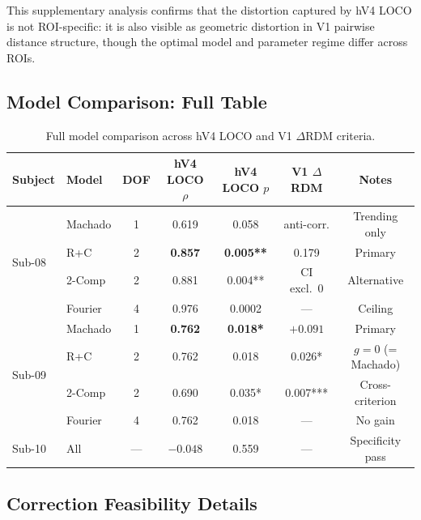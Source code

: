 \documentclass{article}
\begin{document}
This supplementary analysis confirms that the distortion captured by hV4 LOCO is not ROI-specific: it is also visible as geometric distortion in V1 pairwise distance structure, though the optimal model and parameter regime differ across ROIs.

\subsection{Model Comparison: Full Table}

\begin{table}[h]
  \caption{Full model comparison across hV4 LOCO and V1 $\Delta$RDM criteria.}
  \label{tab:full}
  \begin{center}
    \begin{small}
      \begin{tabular}{llccccc}
        \toprule
        Subject & Model & DOF & hV4 LOCO $\rho$ & hV4 LOCO $p$ & V1 $\Delta$RDM & Notes \\
        \midrule
        \multirow{4}{*}{Sub-08} & Machado & 1 & 0.619 & 0.058 & anti-corr. & Trending only \\
        & R+C & 2 & \textbf{0.857} & \textbf{0.005**} & 0.179 & Primary \\
        & 2-Comp & 2 & 0.881 & 0.004** & CI excl.\ 0 & Alternative \\
        & Fourier & 4 & 0.976 & 0.0002 & --- & Ceiling \\
        \midrule
        \multirow{4}{*}{Sub-09} & Machado & 1 & \textbf{0.762} & \textbf{0.018*} & $+0.091$ & Primary \\
        & R+C & 2 & 0.762 & 0.018 & 0.026* & $g{=}0$ (= Machado) \\
        & 2-Comp & 2 & 0.690 & 0.035* & 0.007*** & Cross-criterion \\
        & Fourier & 4 & 0.762 & 0.018 & --- & No gain \\
        \midrule
        Sub-10 & All & --- & $-0.048$ & 0.559 & --- & Specificity pass \\
        \bottomrule
      \end{tabular}
    \end{small}
  \end{center}
\end{table}

\subsection{Correction Feasibility Details}
\end{document}
